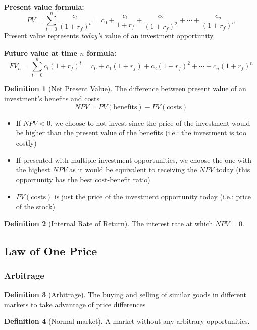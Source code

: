 \documentclass[11pt]{article}
\theoremstyle{definition}
\newtheorem*{definition}{Definition}
\begin{document}
\textbf{Present value formula:}
\begin{equation*}
    PV = \sum_{t=0}^n \frac{c_t}{(1 + r_f)^t} = c_0 + \frac{c_1}{1 + r_f} + \frac{c_2}{(1 + r_f)^2} + \cdots + \frac{c_n}{(1 + r_f)^n}
\end{equation*}
Present value represents \textit{today's} value of an investment opportunity.
\vspace{0.5cm}

\textbf{Future value at time $n$ formula:}
\begin{equation*}
    FV_n = \sum_{t = 0}^n c_t(1 + r_f)^t = c_0 + c_1(1 + r_f) + c_2(1 + r_f)^2 + \cdots + c_n(1 + r_f)^n
\end{equation*}

\begin{definition}[Net Present Value]
    The difference between present value of an investment's benefits and costs
    \begin{equation*}
        NPV = PV(\text{benefits})  - PV(\text{costs})
    \end{equation*}
\end{definition}
\begin{itemize}
    \item If $NPV < 0$, we choose to not invest since the price of the investment would be higher than the present value of the benefits (i.e.: the investment is too costly)
    \item If presented with multiple investment opportunities, we choose the one with the highest $NPV$ as it would be equivalent to receiving the $NPV$ today (this opportunity has the best cost-benefit ratio)
    \item $PV(\text{costs})$ is just the price of the investment opportunity today (i.e.: price of the stock)
\end{itemize}

\begin{definition}[Internal Rate of Return]
    The interest rate at which $NPV = 0$.
\end{definition}

\subsection{Law of One Price}
\subsubsection{Arbitrage}
\begin{definition}[Arbitrage]
    The buying and selling of similar goods in different markets to take advantage of price differences
\end{definition}
\begin{definition}[Normal market]
    A market without any arbitrary opportunities.
\end{definition}
\end{document}
